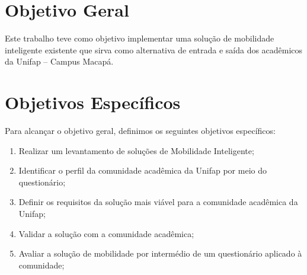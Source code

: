 \begin{comment}
que os problemas de mobilidade existentes
atualmente em Macapá atingem diretamente a comunidade acadêmica da Universidade Federal do Amapá, este trabalho buscará entender o perfil e as principais dificuldades da comunidade acadêmica, e, a partir de um estudo de soluções existentes no contexto de CI para propor uma solução que seja viável e admissível para a comunidade acadêmica da Unifap

%
\end{comment}

\section {Objetivo Geral}

Este trabalho teve como objetivo implementar uma solução de mobilidade inteligente existente que sirva como alternativa de entrada e saída dos acadêmicos da Unifap -- Campus Macapá.

\section{Objetivos Específicos}

Para alcançar o objetivo geral, definimos os seguintes objetivos específicos:

\begin{enumerate}

\item Realizar um levantamento de soluções de Mobilidade Inteligente;

\item Identificar o perfil da comunidade acadêmica da Unifap por meio do questionário; %

\item Definir os requisitos da solução mais viável para a comunidade acadêmica da Unifap;

\item Validar a solução com a comunidade acadêmica;

\item Avaliar a solução de mobilidade por intermédio de um questionário aplicado à comunidade;

\end{enumerate}

